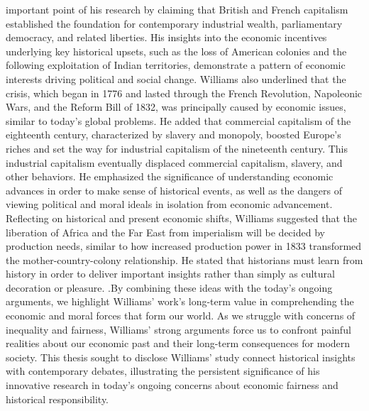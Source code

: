 important point of his research by claiming that British and French capitalism established the foundation for contemporary industrial wealth, parliamentary democracy, and related liberties. His insights into the economic incentives underlying key historical upsets, such as the loss of American colonies and the following exploitation of Indian territories, demonstrate a pattern of economic interests driving political and social change. Williams also underlined that the crisis, which began in 1776 and lasted through the French Revolution, Napoleonic Wars, and the Reform Bill of 1832, was principally caused by economic issues, similar to today's global problems. He added that commercial capitalism of the eighteenth century, characterized by slavery and monopoly, boosted Europe's riches and set the way for industrial capitalism of the nineteenth century. This industrial capitalism eventually displaced commercial capitalism, slavery, and other behaviors. He emphasized the significance of understanding economic advances in order to make sense of historical events, as well as the dangers of viewing political and moral ideals in isolation from economic advancement. Reflecting on historical and present economic shifts, Williams suggested that the liberation of Africa and the Far East from imperialism will be decided by production needs, similar to how increased production power in 1833 transformed the mother-country-colony relationship. He stated that historians must learn from history in order to deliver important insights rather than simply as cultural decoration or pleasure. .By combining these ideas with the today's  ongoing arguments, we highlight Williams' work's long-term value in comprehending the economic and moral forces that form our world. As we struggle with concerns of inequality and fairness, Williams' strong arguments force us to confront painful realities about our economic past and their long-term consequences for modern society. This thesis sought to disclose Williams' study connect historical insights with contemporary debates, illustrating the persistent significance of his innovative research in today's ongoing concerns about economic fairness and historical responsibility.
